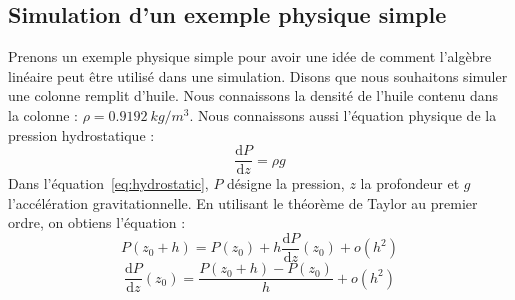 \subsection{Simulation d'un exemple physique simple}
Prenons un exemple physique simple pour avoir une idée de comment l'algèbre linéaire peut être utilisé dans une simulation.
%
Disons que nous souhaitons simuler une colonne remplit d'huile.
%
Nous connaissons la densité de l'huile contenu dans la colonne : $\rho = 0.9192~kg/m^3$.
%
Nous connaissons aussi l'équation physique de la pression hydrostatique :
%
\begin{equation}
\label{eq:hydrostatic}
\frac{\mathrm d P}{\mathrm d z} = \rho{}g
\end{equation}
%
Dans l'équation~\eqref{eq:hydrostatic}, $P$ désigne la pression, $z$ la profondeur et $g$ l'accélération gravitationnelle.
%
En utilisant le théorème de Taylor au premier ordre, on obtiens l'équation :
%
\begin{equation}
P(z_0+h) = P(z_0) + h \frac{\mathrm d P}{\mathrm d z} (z_0) + o(h^2)
\end{equation}
\begin{equation}
\frac{\mathrm d P}{\mathrm d z} (z_0) = \frac{P(z_0+h) - P(z_0)}{h} + o(h^2)
\end{equation}

